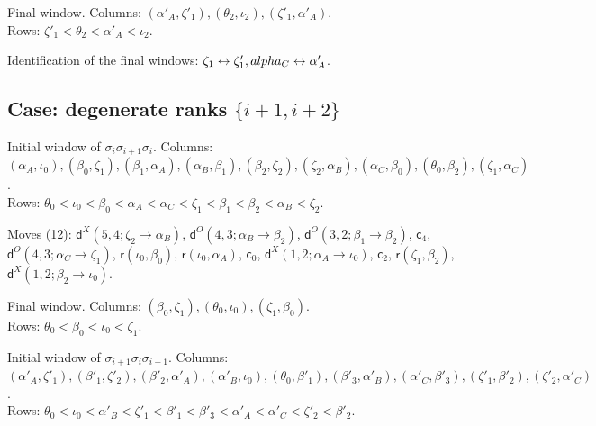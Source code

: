\documentclass[11pt]{amsart}
\theoremstyle{definition}
\theoremstyle{remark}
\begin{document}
\noindent Final window. Columns: $(\alpha'_A,\zeta'_1),\allowbreak (\theta_2,\iota_2),\allowbreak (\zeta'_1,\alpha'_A)$.\\ Rows: $\zeta'_1 <\allowbreak \theta_2 <\allowbreak \alpha'_A <\allowbreak \iota_2$.\par\medskip
\noindent Identification of the final windows: $\zeta_1\leftrightarrow \zeta'_1,\allowbreak \\alpha_C\leftrightarrow \alpha'_A$.\par\bigskip
\subsection*{Case: degenerate ranks \texorpdfstring{$\{i+1,i+2\}$}{i+1,i+2}}
\noindent Initial window of $\sigma_i\sigma_{i+1}\sigma_i$. Columns: $(\alpha_A,\iota_0),\allowbreak (\beta_0,\zeta_1),\allowbreak (\beta_1,\alpha_A),\allowbreak (\alpha_B,\beta_1),\allowbreak (\beta_2,\zeta_2),\allowbreak (\zeta_2,\alpha_B),\allowbreak (\alpha_C,\beta_0),\allowbreak (\theta_0,\beta_2),\allowbreak (\zeta_1,\alpha_C)$.\\ Rows: $\theta_0 <\allowbreak \iota_0 <\allowbreak \beta_0 <\allowbreak \alpha_A <\allowbreak \alpha_C <\allowbreak \zeta_1 <\allowbreak \beta_1 <\allowbreak \beta_2 <\allowbreak \alpha_B <\allowbreak \zeta_2$.\par
\noindent Moves (12): $\mathsf{d}^{X}(5,4;\zeta_2\to\alpha_B)$, $\mathsf{d}^{O}(4,3;\alpha_B\to\beta_2)$, $\mathsf{d}^{O}(3,2;\beta_1\to\beta_2)$, $\mathsf{c}_{4}$, $\mathsf{d}^{O}(4,3;\alpha_C\to\zeta_1)$, $\mathsf{r}(\iota_0,\beta_0)$, $\mathsf{r}(\iota_0,\alpha_A)$, $\mathsf{c}_{0}$, $\mathsf{d}^{X}(1,2;\alpha_A\to\iota_0)$, $\mathsf{c}_{2}$, $\mathsf{r}(\zeta_1,\beta_2)$, $\mathsf{d}^{X}(1,2;\beta_2\to\iota_0)$.\par
\noindent Final window. Columns: $(\beta_0,\zeta_1),\allowbreak (\theta_0,\iota_0),\allowbreak (\zeta_1,\beta_0)$.\\ Rows: $\theta_0 <\allowbreak \beta_0 <\allowbreak \iota_0 <\allowbreak \zeta_1$.\par\medskip
\noindent Initial window of $\sigma_{i+1}\sigma_i\sigma_{i+1}$. Columns: $(\alpha'_A,\zeta'_1),\allowbreak (\beta'_1,\zeta'_2),\allowbreak (\beta'_2,\alpha'_A),\allowbreak (\alpha'_B,\iota_0),\allowbreak (\theta_0,\beta'_1),\allowbreak (\beta'_3,\alpha'_B),\allowbreak (\alpha'_C,\beta'_3),\allowbreak (\zeta'_1,\beta'_2),\allowbreak (\zeta'_2,\alpha'_C)$.\\ Rows: $\theta_0 <\allowbreak \iota_0 <\allowbreak \alpha'_B <\allowbreak \zeta'_1 <\allowbreak \beta'_1 <\allowbreak \beta'_3 <\allowbreak \alpha'_A <\allowbreak \alpha'_C <\allowbreak \zeta'_2 <\allowbreak \beta'_2$.\par
\end{document}
